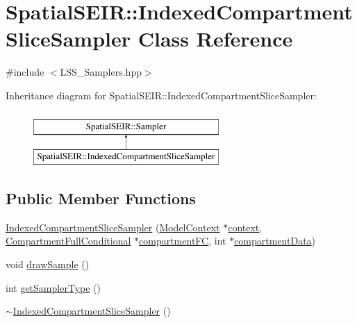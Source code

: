 \hypertarget{classSpatialSEIR_1_1IndexedCompartmentSliceSampler}{\section{Spatial\-S\-E\-I\-R\-:\-:Indexed\-Compartment\-Slice\-Sampler Class Reference}
\label{classSpatialSEIR_1_1IndexedCompartmentSliceSampler}
}


{\ttfamily \#include $<$L\-S\-S\-\_\-\-Samplers.\-hpp$>$}

Inheritance diagram for Spatial\-S\-E\-I\-R\-:\-:Indexed\-Compartment\-Slice\-Sampler\-:\begin{figure}[H]
\begin{center}
\leavevmode
\includegraphics[height=2.000000cm]{classSpatialSEIR_1_1IndexedCompartmentSliceSampler}
\end{center}
\end{figure}
\subsection*{Public Member Functions}
\begin{DoxyCompactItemize}
\item 
\hyperlink{classSpatialSEIR_1_1IndexedCompartmentSliceSampler_afc64640b7a48fa0d4785d178cbfb0b93}{Indexed\-Compartment\-Slice\-Sampler} (\hyperlink{classSpatialSEIR_1_1ModelContext}{Model\-Context} $\ast$\hyperlink{classSpatialSEIR_1_1IndexedCompartmentSliceSampler_a387edb6d90edf9b39452985db5accfd4}{context}, \hyperlink{classSpatialSEIR_1_1CompartmentFullConditional}{Compartment\-Full\-Conditional} $\ast$\hyperlink{classSpatialSEIR_1_1IndexedCompartmentSliceSampler_a7fc85c9a378b1d9fc0e23f98500c92ba}{compartment\-F\-C}, int $\ast$\hyperlink{classSpatialSEIR_1_1IndexedCompartmentSliceSampler_ad5b34688ef3b6a8ee52fdcde13308be5}{compartment\-Data})
\item 
void \hyperlink{classSpatialSEIR_1_1IndexedCompartmentSliceSampler_aba6f0bd34d4fc684ac844767a09dab95}{draw\-Sample} ()
\item 
int \hyperlink{classSpatialSEIR_1_1IndexedCompartmentSliceSampler_aeeeeb33f86bf684e6e44914c784847e6}{get\-Sampler\-Type} ()
\item 
\hyperlink{classSpatialSEIR_1_1IndexedCompartmentSliceSampler_a5b26b72e037ed9956acd2bf15ed87ac7}{$\sim$\-Indexed\-Compartment\-Slice\-Sampler} ()
\end{DoxyCompactItemize}
